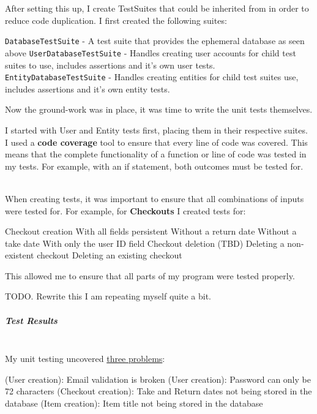\documentclass[../../main.tex]{subfiles}
\begin{document}
\noindent After setting this up, I create TestSuites that could be inherited from in order to reduce code duplication. I first created the following suites:

\begin{outline}
    \1 \lstinline{DatabaseTestSuite} - A test suite that provides the ephemeral database as seen above
    \2 \lstinline{UserDatabaseTestSuite} - Handles creating user accounts for child test suites to use, includes assertions and it's own user tests.
    \2 \lstinline{EntityDatabaseTestSuite} - Handles creating entities for child test suites use, includes assertions and it's own entity tests.
\end{outline}

\noindent Now the ground-work was in place, it was time to write the unit tests themselves.

\noindent I started with User and Entity tests first, placing them in their respective suites.
I used a \textbf{code coverage} tool to ensure that every line of code was covered.
This means that the complete functionality of a function or line of code was tested in my tests.
For example, with an if statement, both outcomes must be tested for.

\noindent \\ When creating tests, it was important to ensure that all combinations of inputs were tested for.
For example, for \textbf{Checkouts} I created tests for:

\begin{outline}
    \1 Checkout creation
    \2 With all fields persistent
    \2 Without a return date
    \2 Without a take date
    \2 With only the user ID field
    \1 Checkout deletion (TBD)
    \2 Deleting a non-existent checkout
    \2 Deleting an existing checkout
\end{outline}

\noindent This allowed me to ensure that all parts of my program were tested properly.

\noindent TODO. Rewrite this I am repeating myself quite a bit.


\subparagraph{Test Results}

\noindent \\ My unit testing uncovered \underline{three problems}:

\begin{outline}
    \1 (User creation): Email validation is broken
    \1 (User creation): Password can only be 72 characters
    \1 (Checkout creation): Take and Return dates not being stored in the database
    \1 (Item creation): Item title not being stored in the database
\end{outline}
\end{document}
